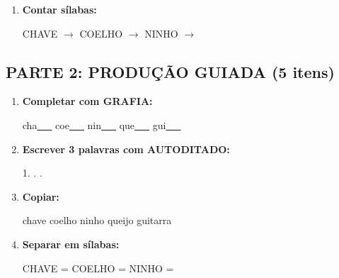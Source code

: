 \begin{exercicio}
\begin{enumerate}
  \item \textbf{Contar sílabas:}
  \begin{center}
  CHAVE $\rightarrow$ \underline{\hspace{0.9cm}} \quad COELHO $\rightarrow$ \underline{\hspace{0.9cm}} \quad NINHO $\rightarrow$ \underline{\hspace{0.9cm}}
  \end{center}

\end{enumerate}

\subsection*{PARTE 2: PRODUÇÃO GUIADA (5 itens)}

\begin{enumerate}[resume]

  \item \textbf{Completar com GRAFIA:}
  \begin{center}
  cha\underline{~~~} \quad coe\underline{~~~} \quad nin\underline{~~~} \quad que\underline{~~~} \quad gui\underline{~~~}
  \end{center}

  \item \textbf{Escrever 3 palavras com AUTODITADO:}
  \begin{center}
  1. \underline{\hspace{3cm}} . \underline{\hspace{3cm}} . \underline{\hspace{3cm}}
  \end{center}

  \item \textbf{Copiar:}
  \begin{center}
  chave \quad coelho \quad ninho \quad queijo \quad guitarra
  \end{center}

  \item \textbf{Separar em sílabas:}
  \begin{center}
  CHAVE = \underline{\hspace{1cm}} \underline{\hspace{1cm}} \quad COELHO = \underline{\hspace{1cm}} \underline{\hspace{1cm}} \quad NINHO = \underline{\hspace{1cm}} \underline{\hspace{1cm}}
  \end{center}


\end{enumerate}
\end{exercicio}
